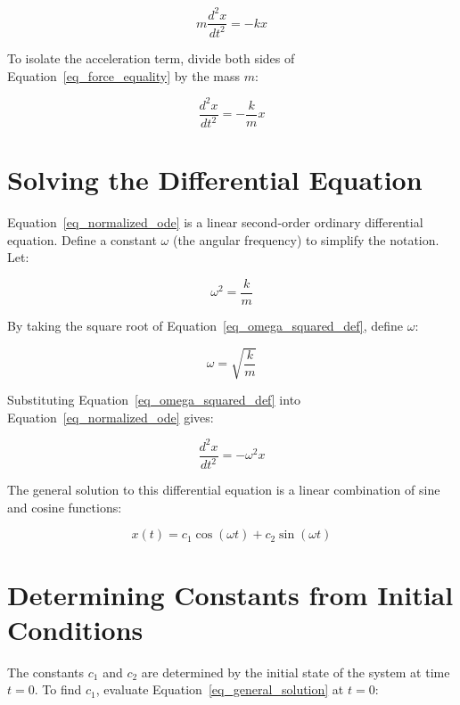 \documentclass{article}
\begin{document}
\begin{equation}
m \frac{d^2 x}{d t^2} = -k x
\label{eq_force_equality}
\end{equation}

To isolate the acceleration term,  divide both sides of Equation~\ref{eq_force_equality} by the mass $m$:

\begin{equation}
\frac{d^2 x}{d t^2} = -\frac{k}{m} x
\label{eq_normalized_ode}
\end{equation}

\section{Solving the Differential Equation}

Equation~\ref{eq_normalized_ode} is a linear second-order ordinary differential equation. Define a constant $\omega$ (the angular frequency) to simplify the notation. Let:

\begin{equation}
\omega^2 = \frac{k}{m}
\label{eq_omega_squared_def}
\end{equation}

By taking the square root of Equation~\ref{eq_omega_squared_def},  define $\omega$:

\begin{equation}
\omega = \sqrt{\frac{k}{m}}
\label{eq_omega_definition}
\end{equation}

Substituting Equation~\ref{eq_omega_squared_def} into Equation~\ref{eq_normalized_ode} gives:

\begin{equation}
\frac{d^2 x}{d t^2} = -\omega^2 x
\label{eq_ode_with_omega}
\end{equation}

The general solution to this differential equation is a linear combination of sine and cosine functions:

\begin{equation}
x(t) = c_1 \cos(\omega t) + c_2 \sin(\omega t)
\label{eq_general_solution}
\end{equation}

\section{Determining Constants from Initial Conditions}

The constants $c_1$ and $c_2$ are determined by the initial state of the system at time $t=0$. To find $c_1$,  evaluate Equation~\ref{eq_general_solution} at $t=0$:
\end{document}
